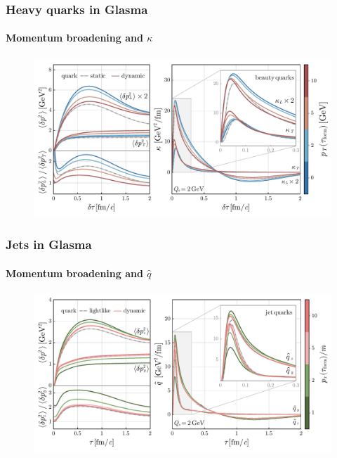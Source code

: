\documentclass[aspectratio=169,11pt,usenames,dvipsnames]{beamer}
\begin{document}
\begin{frame}
    \frametitle{Heavy quarks in Glasma}
    \framesubtitle{Momentum broadening and $\kappa$}
    \vspace{5pt}
    \begin{center}
        \begin{figure}[!hbt]
        \centering
        \includegraphics[width=1.6\textheight]{images/hp23_mom_broad_kappa_anis_wong_vs_kappa.pdf}
        \end{figure}
        \end{center}
    \end{frame}

\begin{frame}
    \frametitle{Jets in Glasma}
    \framesubtitle{Momentum broadening and $\hat{q}$}
    \vspace{5pt}
    \begin{center}
        \begin{figure}[!hbt]
        \centering
        \includegraphics[width=1.6\textheight]{images/hp23_mom_broad_qhat_anis_wong_vs_qhat.pdf}
        \end{figure}
        \end{center}
    \end{frame}
\end{document}
